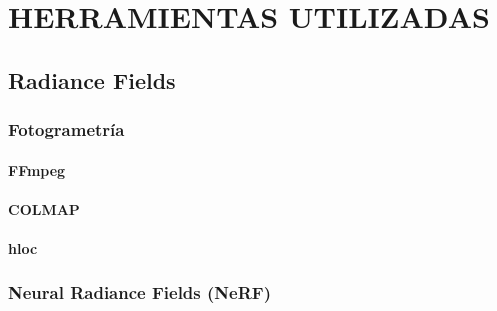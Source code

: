 \documentclass[a4paper, 12pt, spanish, twoside]{article}
\begin{document}
\clearpage





\newpage
\section{HERRAMIENTAS UTILIZADAS} \label{sec:herramientas}



\subsection{Radiance Fields} \label{sec:herramientas:radfi}

\subsubsection{Fotogrametría} \label{sec:herramientas:radfi:fotogram}

\paragraph{FFmpeg} \label{sec:herramientas:radfi:fotogram:ffmpeg}

\paragraph{COLMAP} \label{sec:herramientas:radfi:fotogram:colmap}

\paragraph{hloc} \label{sec:herramientas:radfi:fotogram:hloc}

\subsubsection{Neural Radiance Fields (NeRF)} \label{sec:herramientas:radfi:nerf}
\end{document}
